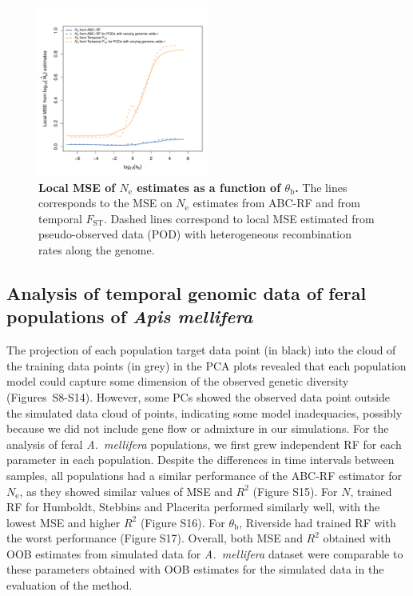 \documentclass[a4paper, 12pt]{article}
\begin{document}
\begin{figure}[ht]
 \centering
 \includegraphics[width=0.50\textwidth]{Figures/Figure3_abcrfNE_fstNE_local_mse_recomb.pdf}
 \small\caption{\textbf{Local MSE of $N_{\mathrm{e}}$ estimates as a function of $\theta_{\mathrm{b}}$.} The lines corresponds to the MSE on $N_{\mathrm{e}}$ estimates from ABC-RF and from temporal $F_{\mathrm{ST}}$. Dashed lines correspond to local MSE estimated from pseudo-observed data (POD) with heterogeneous recombination rates along the genome.}
 \label{fig:local_mse_nes}
\end{figure}

\subsection*{Analysis of temporal genomic data of feral populations of \textit{Apis mellifera}}

The projection of each population target data point (in black) into the cloud of the training data points (in grey) in the PCA plots revealed that each population model could capture some dimension of the observed genetic diversity (Figures~S8-S14). However, some PCs showed the observed data point outside the simulated data cloud of points, indicating some model inadequacies, possibly because we did not include gene flow or admixture in our simulations. For the analysis of feral \textit{A.\ mellifera} populations, we first grew independent RF for each parameter in each population. Despite the differences in time intervals between samples, all populations had a similar performance of the ABC-RF estimator for $N_{\mathrm{e}}$, as they showed similar values of MSE and $R^2$ (Figure S15). For $N$, trained RF for Humboldt, Stebbins and Placerita performed similarly well, with the lowest MSE and higher $R^2$ (Figure S16). For $\theta_\mathrm{b}$, Riverside had trained RF with the worst performance (Figure S17). Overall, both MSE and $R^2$ obtained with OOB estimates from simulated data for \textit{A.\ mellifera} dataset were comparable to these parameters obtained with OOB estimates for the simulated data in the evaluation of the method. 
\end{document}
